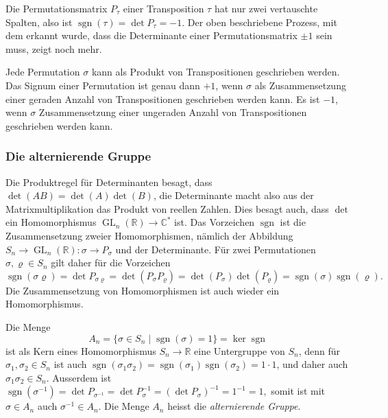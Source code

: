 Die Permutationsmatrix $P_\tau$ einer Transposition $\tau$ hat nur
zwei vertauschte Spalten, also ist $\operatorname{sgn}(\tau)=\det P_\tau=-1$.
Der oben beschriebene Prozess, mit dem erkannt wurde, dass die Determinante
einer Permutationsmatrix $\pm 1$ sein muss, zeigt noch mehr.

\begin{satz}
Jede Permutation $\sigma$ kann als Produkt von Transpositionen
geschrieben werden.
Das Signum einer Permutation ist genau dann $+1$, wenn $\sigma$
als Zusammensetzung einer geraden Anzahl von Transpositionen
geschrieben werden kann.
Es ist $-1$, wenn $\sigma$ Zusammensetzung einer ungeraden Anzahl
von Transpositionen geschrieben werden kann.
\end{satz}

%
%
\subsubsection{Die alternierende Gruppe}
Die Produktregel für Determinanten besagt, dass $\det(AB)=\det(A)\det(B)$,
die Determinante macht also aus der Matrixmultiplikation das Produkt von
reellen Zahlen.
Dies besagt auch, dass $\det$ ein Homomorphismus
$\operatorname{GL}_n(\mathbb{R}) \to \mathbb{C}^*$ ist.
Das Vorzeichen $\operatorname{sgn}$ ist die Zusammensetzung zweier
Homomorphismen, nämlich der Abbildung
$S_n\to\operatorname{GL}_n(\mathbb{R}):\sigma\to P_\sigma$
und der Determinante.
Für zwei Permutationen $\sigma,\varrho\in S_n$ gilt daher für die Vorzeichen
\[
\operatorname{sgn}(\sigma\varrho)
=
\det P_{\sigma\varrho}
=
\det(P_\sigma P_\varrho)
=
\det(P_\sigma)\det( P_\varrho)
=
\operatorname{sgn}(\sigma)
\operatorname{sgn}(\varrho).
\]
Die Zusammensetzung von Homomorphismen ist auch wieder ein Homomorphismus.

Die Menge
\[
A_n
=
\{ \sigma\in S_n \mid \operatorname{sgn}(\sigma) = 1 \}
=
\ker
\operatorname{sgn}
\]
ist als Kern eines Homomorphismus $S_n\to\mathbb{R}$
eine Untergruppe von $S_n$, denn für $\sigma_1,\sigma_2\in S_n$ ist auch
\(
\operatorname{sgn}(\sigma_1\sigma_2)
=
\operatorname{sgn}(\sigma_1)
\operatorname{sgn}(\sigma_2)
=
1\cdot 1
\),
und daher auch $\sigma_1\sigma_2\in S_n$.
Ausserdem ist 
\(
\operatorname{sgn}(\sigma^{-1})=\det P_{\sigma^{-1}}
=
\det P_\sigma^{-1}
=
(\det P_\sigma)^{-1}
=
1^{-1}=1,
\)
somit ist mit $\sigma\in A_n$ auch $\sigma^{-1}\in A_n$.
Die Menge $A_n$ heisst die {\em alternierende Gruppe}.
%
%


